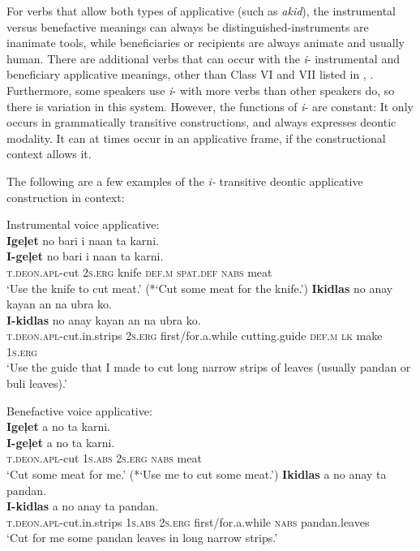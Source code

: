 For verbs that allow both types of applicative (such as \textit{akid}), the instrumental versus benefactive meanings can always be distinguished-instruments are inanimate tools, while beneficiaries or recipients are always animate and usually human. There are additional verbs that can occur with the \textit{i}{}- instrumental and beneficiary applicative meanings, other than Class VI and VII listed in , . Furthermore, some speakers use \textit{i}{}- with more verbs than other speakers do, so there is variation in this system. However, the functions of \textit{i}{}- are constant: It only occurs in grammatically transitive constructions, and always expresses deontic modality. It can at times occur in an applicative frame, if the constructional context allows it.

The following are a few examples of the \textit{i-} transitive deontic applicative construction in context:

\ea
Instrumental voice applicative: \\
\textbf{Igeļet}  no  bari  i  naan  ta  karni. \\\smallskip
 \gll \textbf{I-geļet}  no  bari  i  naan  ta  karni. \\
\textsc{t.deon.apl}-cut  2\textsc{s.erg}  knife  \textsc{def.m}  \textsc{spat.def}  \textsc{nabs}  meat \\
\glt ‘Use the knife to cut meat.’ (*‘Cut some meat for the knife.’)
\z
\ea
\textbf{Ikidlas}  no  anay  kayan  an  na  ubra  ko. \\\smallskip
 \gll \textbf{I-kidlas}  no  anay  kayan  an  na  ubra  ko. \\
\textsc{t.deon.apl}-cut.in.strips  2\textsc{s.erg}  first/for.a.while  cutting.guide  \textsc{def.m}
\textsc{lk}  make  1\textsc{s.erg} \\
\glt ‘Use the guide that I made to cut long narrow strips of leaves (usually pandan or buli leaves).’
\z

\ea
Benefactive voice applicative: \\
\textbf{Igeļet}  a  no  ta  karni. \\\smallskip
 \gll \textbf{I-geļet}  a  no  ta  karni. \\
\textsc{t.deon.apl}-cut  1\textsc{s.abs}  2\textsc{s.erg}  \textsc{nabs}  meat \\
\glt ‘Cut some meat for me.’ (*‘Use me to cut some meat.’)
\z
\ea
\textbf{Ikidlas}  a  no  anay  ta  pandan. \\\smallskip
 \gll \textbf{I-kidlas}  a  no  anay  ta  pandan. \\
\textsc{t.deon.apl}-cut.in.strips  1\textsc{s.abs}  2\textsc{s.erg} first/for.a.while  \textsc{nabs} pandan.leaves \\
\glt ‘Cut for me some pandan leaves in long narrow strips.’
\z

